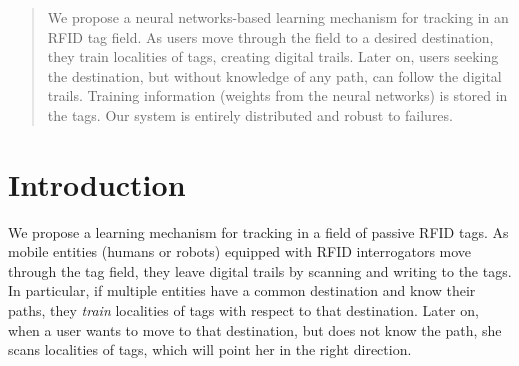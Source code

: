 \documentclass[conference]{IEEEtran}
\begin{document}
\maketitle


\begin{abstract}
We propose a neural networks-based learning mechanism for tracking in an RFID tag field. As users move through the field to a desired destination, they train localities of tags, creating digital trails. Later on, users seeking the destination, but without knowledge of any path, can follow the digital trails. Training information (weights from the neural networks) is stored in the tags. Our system is entirely distributed and robust to failures. 
\end{abstract}





%
\IEEEpeerreviewmaketitle


\section{Introduction}
We propose a learning mechanism for tracking in a field of passive RFID tags. As mobile entities (humans or robots) equipped with RFID interrogators move through the tag field, they leave digital trails by scanning and writing to the tags. In particular, if multiple entities have a common destination and know their paths, they \emph{train} localities of tags with respect to that destination. Later on, when a user wants to move to that destination, but does not know the path, she scans localities of tags, which will point her in the right direction.
\end{document}
